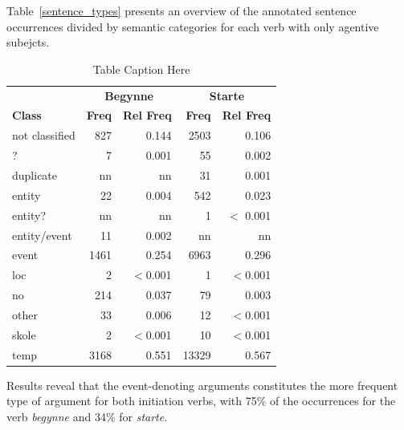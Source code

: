 \documentclass{article}
\begin{document}
Table~\ref{sentence_types} presents an overview of the annotated sentence occurrences divided by semantic categories for each verb with only agentive subejcts.
\begin{table}[!]
    \centering
    \begin{tabular}{lrrrr}
        \toprule
        & \multicolumn{2}{c}{\textbf{Begynne}} & \multicolumn{2}{c}{\textbf{Starte}} \\
        \cmidrule(lr){2-3} \cmidrule(lr){4-5}
        \textbf{Class} & \textbf{Freq} & \textbf{Rel Freq} & \textbf{Freq} & \textbf{Rel Freq} \\
        \midrule

        not classified  &        827 & 0.144    &       2503 &    0.106 \\
        ?               &          7 & 0.001    &         55 &    0.002\\
        duplicate       &        nn  & nn       &         31 &    0.001 \\
        entity          &         22 & 0.004    &        542 &    0.023\\
        entity?         &        nn   & nn         &          1 &    $<$ 0.001 \\
        entity/event    &         11 & 0.002    &      nn      &      nn        \\
        event           &       1461 & 0.254    &       6963 &    0.296\\
        loc             &          2 & $<$0.001 &          1 &    $<$0.001\\
        no              &        214 & 0.037    &         79 &    0.003\\
        other           &         33 & 0.006    &         12 &    $<$0.001\\
        skole           &          2 & $<$0.001 &         10 &    $<$0.001 \\
        temp            &       3168 & 0.551    &      13329 &    0.567\\
        \bottomrule
    \end{tabular}
    \caption{Table Caption Here}
    \label{tab:mytable}
\end{table}
Results reveal that the event-denoting arguments constitutes the more frequent type of argument for both initiation verbs, with 75\% of the occurrences for the verb \emph{begynne} and 34\% for \emph{starte}. 
\end{document}
